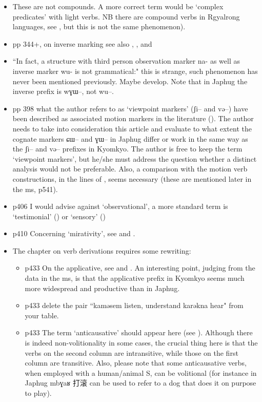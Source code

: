 \documentclass[oldfontcommands,oneside,a4paper,11pt]{article}
\newcommand{\ipa}[1]{{\phon \mbox{#1}}} %
\newcommand{\zh}[1]{{\cn #1}}
\begin{document}
\begin{itemize}
\item These are not compounds. A more correct term would be `complex predicates' with light verbs. NB there are compound verbs in Rgyalrong languages, see \citet{jacques12incorp}, but this is not the same phenomenon).
\item pp 344+, on inverse marking see also \citet{gongxun14agreement}, \citet{jacques14inverse}, \citet{jacques14rtau} and \citet{lai14person}
\item ``In fact, a structure with third person observation marker na- as well as inverse marker wu- is not
grammatical:" this is strange, such phenomenon has never been mentioned previously. Maybe develop. Note that in Japhug the inverse prefix is \ipa{wɣɯ--}, not \ipa{wu--}.
\item pp 398 what the author refers to as `viewpoint markers' (\ipa{ʃi--} and \ipa{və--}) have been described as associated motion markers in the literature (\citealt{jacques13harmonization}). The author needs to take into consideration this article and evaluate to what extent the cognate markers \ipa{ɕɯ--} and \ipa{ɣɯ--} in Japhug differ or work in the same way as the \ipa{ʃi--} and \ipa{və--} prefixes in Kyomkyo. The author is free to keep the term `viewpoint markers', but he/she must address  the question whether a distinct analysis would not be preferable. Also, a comparison with the motion verb constructions, in the lines of \citet[203]{jacques13harmonization}, seems necessary (these are mentioned later in the ms, p541).
\item p406 I would advise against `observational', a more standard term is `testimonial' (\citealt{hill13hdug}) or `sensory' (\citealt{tournadre14evidentiality})
\item p410 Concerning `mirativity', see \citet{hill13hdug} and \citealt{tournadre14evidentiality}.
\item The chapter on verb derivations requires some rewriting:
\begin{itemize}
\item p433 On the applicative, see \citet{jacques13tropative} and \citet{jackson14morpho}. An interesting point, judging from the data in the ms, is that the applicative prefix in Kyomkyo seems much more widespread and productive than in Japhug. 
\item p433 delete the pair ``\ipa{kaməsem} listen, understand \ipa{karəkna} hear" from your table.
\item  p433 The term `anticausative' should appear here (see \citealt{jacques12demotion}). Although there is indeed non-volitionality in some cases, the crucial thing here is that the verbs on the second column are intransitive, while those on the first column are transitive. Also, please note that some anticausative verbs, when employed with a human/animal S, can be volitional (for instance in Japhug \ipa{mbɣaʁ} \zh{打滚}  can be used to refer to a dog that does it on purpose to play).

\end{itemize}
\end{itemize}
\end{document}
